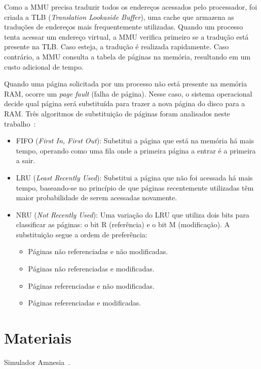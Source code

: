 \documentclass[
	12pt,				%
	oneside,   	        %
	a4paper,			%
	english,			%
	french,				%
	spanish,			%
	brazil,				%
	]{pacotes/abntex2}
\begin{document}
Como a MMU precisa traduzir todos os endereços acessados pelo processador, foi criada a TLB (\textit{Translation Lookaside Buffer}), uma cache que armazena as traduções de endereços mais frequentemente utilizadas. Quando um processo tenta acessar um endereço virtual, a MMU verifica primeiro se a tradução está presente na TLB. Caso esteja, a tradução é realizada rapidamente. Caso contrário, a MMU consulta a tabela de páginas na memória, resultando em um custo adicional de tempo.

Quando uma página solicitada por um processo não está presente na memória RAM, ocorre um \textit{page fault} (falha de página). Nesse caso, o sistema operacional decide qual página será substituída para trazer a nova página do disco para a RAM. Três algoritmos de substituição de páginas foram analisados neste trabalho~\cite{tanenbaum2016}:

\begin{itemize}
    \item FIFO (\textit{First In, First Out}): Substitui a página que está na memória há mais tempo, operando como uma fila onde a primeira página a entrar é a primeira a sair.
    \item LRU (\textit{Least Recently Used}): Substitui a página que não foi acessada há mais tempo, baseando-se no princípio de que páginas recentemente utilizadas têm maior probabilidade de serem acessadas novamente.
    \item NRU (\textit{Not Recently Used}): Uma variação do LRU que utiliza dois bits para classificar as páginas: o bit R (referência) e o bit M (modificação). A substituição segue a ordem de preferência:
    \begin{itemize}
        \item Páginas não referenciadas e não modificadas.
        \item Páginas não referenciadas e modificadas.
        \item Páginas referenciadas e não modificadas.
        \item Páginas referenciadas e modificadas.
    \end{itemize}
\end{itemize}

\section{Materiais}
\label{sec:materiais}

Simulador Amnesia~\cite{oliveira2008}.
\end{document}
